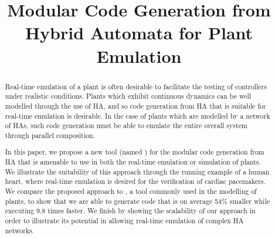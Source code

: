 \documentclass[conference]{IEEEtran}
\begin{document}
	
\title{Modular Code Generation from Hybrid Automata for Plant Emulation }

\author{
}





\maketitle


\begin{abstract}
Real-time emulation of a plant is often desirable to facilitate the testing of controllers under realistic conditions.
Plants which exhibit continuous dynamics can be well modelled through the use of \acf{HA}, and so code generation from \ac{HA} that is suitable for real-time emulation is desirable.
In the case of plants which are modelled by a network of \acp{HA}, such code generation must be able to emulate the entire overall system through parallel composition.

In this paper, we propose a new tool (named \ourTool) for the modular code generation from \ac{HA} that is amenable to use in both the real-time emulation or simulation of plants.
We illustrate the suitability of this approach through the running example of a human heart, where real-time emulation is desired for the verification of cardiac pacemakers.
We compare the proposed approach to \simulink, a tool commonly used in the modelling of plants, to show that we are able to generate code that is on average 54\% smaller while executing 9.8 times faster.
We finish by showing the scalability of our approach in order to illustrate its potential in allowing real-time emulation of complex \ac{HA} networks.
\end{abstract}













 
\end{document}

